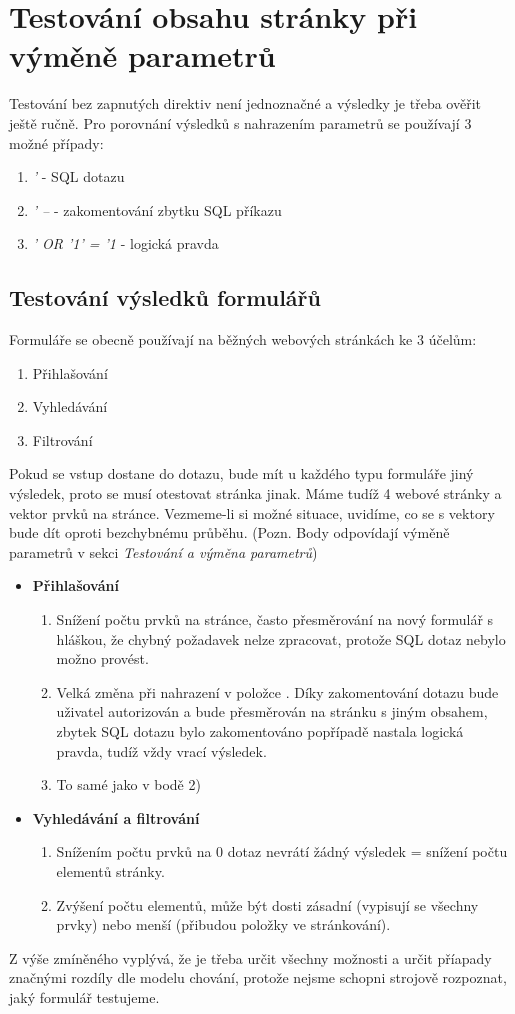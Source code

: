 \section{Testování obsahu stránky při výměně parametrů}
Testování bez zapnutých direktiv není jednoznačné a výsledky je třeba ověřit ještě ručně. Pro porovnání výsledků s nahrazením parametrů se používají 3 možné případy:
\begin{enumerate}
\item \textit{'} -  SQL dotazu
\item \textit{' --} - zakomentování zbytku SQL příkazu
\item \textit{' OR '1' = '1} - logická pravda
\end{enumerate}

\subsection{Testování výsledků formulářů}
Formuláře se obecně používají na běžných webových stránkách ke 3 účelům:
\begin{enumerate}
\item Přihlašování
\item Vyhledávání 
\item Filtrování
\end{enumerate}
Pokud se  vstup dostane do dotazu, bude mít u každého typu formuláře jiný výsledek, proto se musí otestovat stránka jinak. Máme tudíž 4 webové stránky a vektor prvků na stránce. Vezmeme-li si možné situace, uvidíme, co se s vektory bude dít oproti bezchybnému průběhu. (Pozn. Body odpovídají výměně parametrů v sekci \textit{Testování a výměna parametrů})

\begin{itemize}
\item \textbf{Přihlašování}
\begin{enumerate}
\item Snížení počtu prvků na stránce, často přesměrování na nový formulář s hláškou, že chybný požadavek nelze zpracovat, protože SQL dotaz nebylo možno provést.
\item Velká změna při nahrazení v položce . Díky zakomentování dotazu bude uživatel autorizován a bude přesměrován na stránku s jiným obsahem, zbytek SQL dotazu bylo zakomentováno popřípadě nastala logická pravda, tudíž vždy vrací výsledek.
\item To samé jako v bodě 2)
\end{enumerate}
\item \textbf{Vyhledávání a filtrování}
\begin{enumerate}
\item Snížením počtu prvků na 0 dotaz nevrátí žádný výsledek = snížení počtu elementů stránky.
\item Zvýšení počtu elementů, může být dosti zásadní (vypisují se všechny prvky) nebo menší (přibudou položky ve stránkování).
\end{enumerate}
\end{itemize}
Z výše zmíněného vyplývá, že je třeba určit všechny možnosti a určit příapady značnými rozdíly dle modelu chování, protože nejsme schopni strojově rozpoznat, jaký formulář testujeme.

